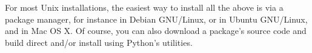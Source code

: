 For most Unix installations, the easiest way to install all the
above is via a package manager, for instance  in
Debian GNU/Linux,  or  in Ubuntu
GNU/Linux, and  in Mac OS X.  Of course, you can also
download a package's source code and build direct and/or install
using Python's
utilities.




